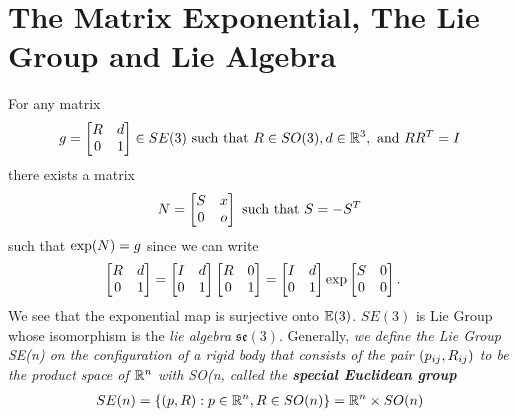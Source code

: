 \section{The Matrix Exponential, The Lie Group and Lie Algebra}
%
For any matrix 
%
\begin{align}
g = \begin{bmatrix}
{R} & {d} \\
0 & 1
\end{bmatrix} \in SE(3) \text{ such that } {R} \in SO(3), {d} \in \mathbb{R}^3, \text{ and } {R}{R}^T = I
\end{align}
%
there exists a matrix 
%
\begin{align}
N = \begin{bmatrix}
S & x \\
0 & o
\end{bmatrix} \text{ such that } S = -S^T
\end{align}
%
such that $\exp(N) = g$ since we can write
%
\begin{align}
\begin{bmatrix}
\rot & \disp \\
0 & 1
\end{bmatrix}  
%
&=  \begin{bmatrix}
\identity & \disp \\
0 & 1
\end{bmatrix}
%
\begin{bmatrix}
\rot & 0 \\
0 & 1
\end{bmatrix}  =  \begin{bmatrix}
\identity & \disp \\
0 & 1
\end{bmatrix} 
%
\exp 
\begin{bmatrix}
\skew & 0 \\
0 & 0
\end{bmatrix}.
\label{eq:eulers_theorem}
\end{align}
%
We see that the exponential map is surjective onto $\mathbb{E}(3)$. $SE(3)$ is Lie Group whose isomorphism is the \textit{lie algebra} $\mathfrak{se(3)}$. 
Generally, \textit{we define the Lie Group \textit{SE(n)} on the configuration of a rigid body that consists of the pair $(p_{ij},{R}_{ij})$ to be the product space of $\mathbb{R}^n$ with \textit{SO(n}, called the \textbf{special Euclidean group}} \ie
%
\begin{align}
SE(n) = \{(p, R): p \in \mathbb{R}^n, {R} \in SO(n)\} = \mathbb{R}^n \times SO(n)
\label{eq:special_euclid3}
\end{align}

